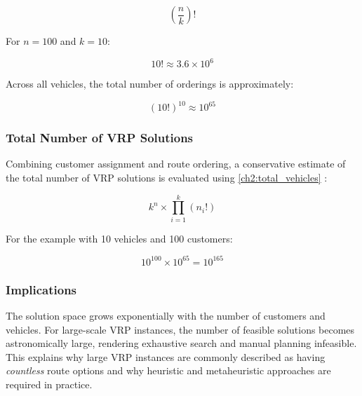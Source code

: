 \documentclass[a4paper]{report}
\begin{document}
{\begin{itemize}
\begin{equation}
    \left(\frac{n}{k} \right)!
    \label{ch2:route_factorial}
\end{equation}


For \(n = 100\) and \(k = 10\):

\[
10! \approx 3.6 \times 10^6
\]

Across all vehicles, the total number of orderings is approximately:

\[
(10!)^{10} \approx 10^{65}
\]

\subsubsection{Total Number of VRP Solutions}

Combining customer assignment and route ordering, a conservative estimate of the total number of VRP solutions is evaluated using \ref{ch2:total_vehicles} \cite{twofactor}:

\begin{equation}
    k^n \times \prod_{i=1}^{k} (n_i!) 
    \label{ch2:total_vehicles}
\end{equation}


For the example with 10 vehicles and 100 customers:

\[
10^{100} \times 10^{65} = 10^{165}
\]

\subsubsection{Implications}

The solution space grows exponentially with the number of customers and vehicles\cite{factorialGrowth}. For large-scale VRP instances, the number of feasible solutions becomes astronomically large, rendering exhaustive search and manual planning infeasible. This explains why large VRP instances are commonly described as having \emph{countless} route options and why heuristic and metaheuristic approaches are required in practice.


\end{itemize}}
\end{document}
